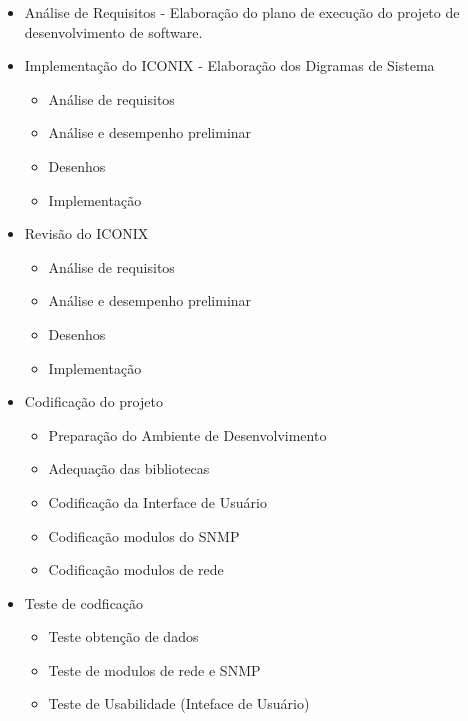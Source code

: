 \begin{itemize}
  \item Análise de Requisitos - Elaboração do plano de execução do projeto de
  desenvolvimento de software.
  \item Implementação do ICONIX - Elaboração dos Digramas de Sistema
  	
  	\begin{itemize}
 	 	\item Análise de requisitos
  		\item Análise e desempenho preliminar
  		\item Desenhos
  		\item Implementação
	\end{itemize}
  	
  \item Revisão do ICONIX
  
  	 \begin{itemize}
 	 	\item Análise de requisitos
  		\item Análise e desempenho preliminar
  		\item Desenhos
  		\item Implementação
	\end{itemize}
	
  \item Codificação do projeto 
  		
  	\begin{itemize}
  	  \item Preparação do Ambiente de Desenvolvimento
  	  \item Adequação das bibliotecas 
  	  \item Codificação da Interface de Usuário
  	  \item Codificação modulos do SNMP
  	  \item Codificação modulos de rede
  	\end{itemize}	
  		
  \item Teste de codficação
  
  	\begin {itemize}
  	  \item Teste obtenção de dados
  	  \item Teste de modulos de rede e SNMP
  	  \item Teste de Usabilidade (Inteface de Usuário)
  	\end{itemize}
  	 
\end{itemize}


